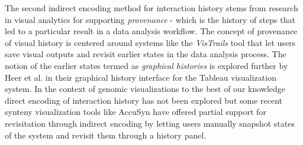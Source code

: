 The second indirect encoding method for interaction history stems from research in visual analytics for supporting \textit{provenance} - which is the history of steps that led to a particular result in a data analysis workflow\cite{gotz2009characterizing,freire2008provenance}. The concept of provenance of visual history is centered around systems like the \textit{VisTrails} tool\cite{bavoil2005vistrails} that let users save visual outputs and revisit earlier states in the data analysis process. The notion of the earlier states termed as \textit{graphical histories} is explored further by Heer et al.\cite{heer2008graphical} in their graphical history interface for the Tableau visualization system.
In the context of genomic visualizations to the best of our knowledge direct encoding of interaction  history has not been explored but some recent synteny visualization tools like AccuSyn have offered partial support for revisitation through indirect encoding by letting users manually snapshot states of the system and revisit them through a history panel.